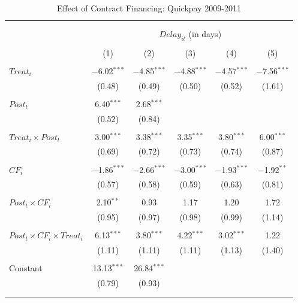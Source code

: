 \documentclass[
]{article}
\begin{document}
\begin{table}[H] \centering 
  \caption{Effect of Contract Financing: Quickpay 2009-2011} 
  \label{} 
\small 
\begin{tabular}{@{\extracolsep{-2pt}}lccccc} 
\\[-1.8ex]\hline 
\hline \\[-1.8ex] 
\\[-1.8ex] & \multicolumn{5}{c}{$Delay_{it}$ (in days)} \\ 
\\[-1.8ex] & (1) & (2) & (3) & (4) & (5)\\ 
\hline \\[-1.8ex] 
 $Treat_i$ & $-$6.02$^{***}$ & $-$4.85$^{***}$ & $-$4.88$^{***}$ & $-$4.57$^{***}$ & $-$7.56$^{***}$ \\ 
  & (0.48) & (0.49) & (0.50) & (0.52) & (1.61) \\ 
  & & & & & \\ 
 $Post_t$ & 6.40$^{***}$ & 2.68$^{***}$ &  &  &  \\ 
  & (0.52) & (0.84) &  &  &  \\ 
  & & & & & \\ 
 $Treat_i \times Post_t$ & 3.00$^{***}$ & 3.38$^{***}$ & 3.35$^{***}$ & 3.80$^{***}$ & 6.00$^{***}$ \\ 
  & (0.69) & (0.72) & (0.73) & (0.74) & (0.87) \\ 
  & & & & & \\ 
 $CF_i$ & $-$1.86$^{***}$ & $-$2.66$^{***}$ & $-$3.00$^{***}$ & $-$1.93$^{***}$ & $-$1.92$^{**}$ \\ 
  & (0.57) & (0.58) & (0.59) & (0.63) & (0.81) \\ 
  & & & & & \\ 
 $Post_t \times CF_i$ & 2.10$^{**}$ & 0.93 & 1.17 & 1.20 & 1.72 \\ 
  & (0.95) & (0.97) & (0.98) & (0.99) & (1.14) \\ 
  & & & & & \\ 
 $Post_t \times CF_i \times Treat_i$ & 6.13$^{***}$ & 3.80$^{***}$ & 4.22$^{***}$ & 3.02$^{***}$ & 1.22 \\ 
  & (1.11) & (1.11) & (1.11) & (1.13) & (1.40) \\ 
  & & & & & \\ 
 Constant & 13.13$^{***}$ & 26.84$^{***}$ &  &  &  \\ 
  & (0.79) & (0.93) &  &  &  \\ 
  & & & & & \\ 
\hline \\[-1.8ex] 

\end{tabular}
\end{table}
\end{document}
